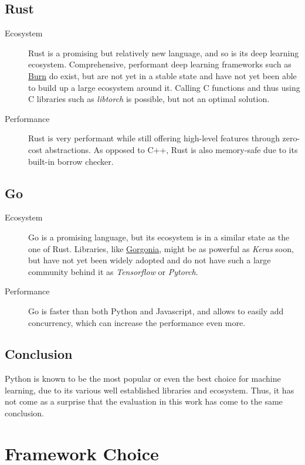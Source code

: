 \documentclass[12pt, a4paper, titlepage]{report}
\begin{document}
{
   \center
   \subsection*{Rust}
}
\begin{description}
   \item[Ecosystem] Rust is a promising but relatively new language, and so is its deep learning ecosystem. Comprehensive, performant deep learning frameworks such as \href{https://github.com/Tracel-AI/burn}{Burn} do exist, but are not yet in a stable state and have not yet been able to build up a large ecosystem around it. Calling C functions and thus using C libraries such as \emph{libtorch} is possible, but not an optimal solution.
   \item[Performance] Rust is very performant while still offering high-level features through zero-cost abstractions. As opposed to C++, Rust is also memory-safe due to its built-in borrow checker.
\end{description}

{
   \center
   \subsection*{Go}
}
\begin{description}
   \item[Ecosystem] Go is a promising language, but its ecosystem is in a similar state as the one of Rust. Libraries, like \href{https://github.com/Tracel-AI/gorgonia}{Gorgonia}, might be as powerful as \emph{Keras} soon, but have not yet been widely adopted and do not have such a large community behind it as \emph{Tensorflow} or \emph{Pytorch}.
   \item[Performance] Go is faster than both Python and Javascript, and allows to easily add concurrency, which can increase the performance even more.
\end{description}


\subsection{Conclusion}

Python is known to be the most popular or even the best choice for machine learning, due to its various well established libraries and ecosystem. Thus, it has not come as a surprise that the evaluation in this work has come to the same conclusion.



\section{Framework Choice}
\end{document}
